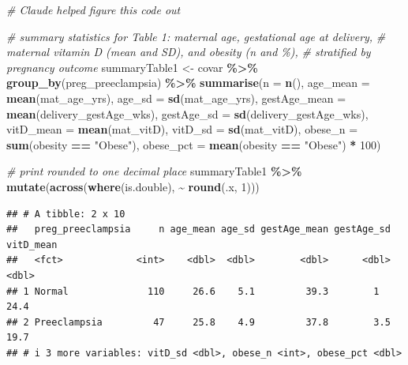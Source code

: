\documentclass[
]{article}
\newenvironment{Shaded}{\begin{snugshade}}{\end{snugshade}}
\newcommand{\AttributeTok}[1]{\textcolor[rgb]{0.13,0.29,0.53}{#1}}
\newcommand{\CommentTok}[1]{\textcolor[rgb]{0.56,0.35,0.01}{\textit{#1}}}
\newcommand{\DecValTok}[1]{\textcolor[rgb]{0.00,0.00,0.81}{#1}}
\newcommand{\FunctionTok}[1]{\textcolor[rgb]{0.13,0.29,0.53}{\textbf{#1}}}
\newcommand{\NormalTok}[1]{#1}
\newcommand{\OtherTok}[1]{\textcolor[rgb]{0.56,0.35,0.01}{#1}}
\newcommand{\SpecialCharTok}[1]{\textcolor[rgb]{0.81,0.36,0.00}{\textbf{#1}}}
\newcommand{\StringTok}[1]{\textcolor[rgb]{0.31,0.60,0.02}{#1}}
\begin{document}
\begin{Shaded}
\begin{Highlighting}[]
\CommentTok{\# Claude helped figure this code out}

\CommentTok{\# summary statistics for Table 1: maternal age, gestational age at delivery,}
\CommentTok{\# maternal vitamin D (mean and SD), and obesity (n and \%),}
\CommentTok{\# stratified by pregnancy outcome}
\NormalTok{summaryTable1 }\OtherTok{\textless{}{-}}\NormalTok{ covar }\SpecialCharTok{\%\textgreater{}\%} 
  \FunctionTok{group\_by}\NormalTok{(preg\_preeclampsia) }\SpecialCharTok{\%\textgreater{}\%} 
  \FunctionTok{summarise}\NormalTok{(}\AttributeTok{n =} \FunctionTok{n}\NormalTok{(),}
            \AttributeTok{age\_mean     =} \FunctionTok{mean}\NormalTok{(mat\_age\_yrs),}
            \AttributeTok{age\_sd       =} \FunctionTok{sd}\NormalTok{(mat\_age\_yrs),}
            \AttributeTok{gestAge\_mean =} \FunctionTok{mean}\NormalTok{(delivery\_gestAge\_wks),}
            \AttributeTok{gestAge\_sd   =} \FunctionTok{sd}\NormalTok{(delivery\_gestAge\_wks),}
            \AttributeTok{vitD\_mean =} \FunctionTok{mean}\NormalTok{(mat\_vitD),}
            \AttributeTok{vitD\_sd   =} \FunctionTok{sd}\NormalTok{(mat\_vitD),}
            \AttributeTok{obese\_n   =} \FunctionTok{sum}\NormalTok{(obesity }\SpecialCharTok{==} \StringTok{"Obese"}\NormalTok{),}
            \AttributeTok{obese\_pct =} \FunctionTok{mean}\NormalTok{(obesity }\SpecialCharTok{==} \StringTok{"Obese"}\NormalTok{) }\SpecialCharTok{*} \DecValTok{100}\NormalTok{)}

\CommentTok{\# print rounded to one decimal place}
\NormalTok{summaryTable1 }\SpecialCharTok{\%\textgreater{}\%} \FunctionTok{mutate}\NormalTok{(}\FunctionTok{across}\NormalTok{(}\FunctionTok{where}\NormalTok{(is.double), }\SpecialCharTok{\textasciitilde{}} \FunctionTok{round}\NormalTok{(.x, }\DecValTok{1}\NormalTok{)))}
\end{Highlighting}
\end{Shaded}

\begin{verbatim}
## # A tibble: 2 x 10
##   preg_preeclampsia     n age_mean age_sd gestAge_mean gestAge_sd vitD_mean
##   <fct>             <int>    <dbl>  <dbl>        <dbl>      <dbl>     <dbl>
## 1 Normal              110     26.6    5.1         39.3        1        24.4
## 2 Preeclampsia         47     25.8    4.9         37.8        3.5      19.7
## # i 3 more variables: vitD_sd <dbl>, obese_n <int>, obese_pct <dbl>
\end{verbatim}
\end{document}
